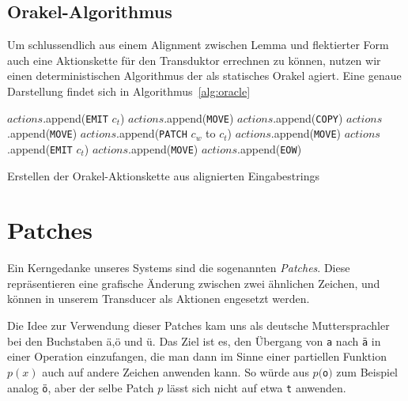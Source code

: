 \documentclass[a4paper]{article}
\newcommand{\action}[1]{\texttt{#1}}
\begin{document}
\subsection{Orakel-Algorithmus}
\label{sec:orakel-alg}
Um schlussendlich aus einem Alignment zwischen Lemma und flektierter Form auch eine Aktionskette für den Transduktor errechnen zu können, nutzen wir einen deterministischen Algorithmus der als statisches Orakel agiert. Eine genaue Darstellung findet sich in Algorithmus~\ref{alg:oracle}

\begin{algorithm}[htb]
\begin{algorithmic}
    	\STATE $actions$.append(\action{EMIT} $c_t$)
    	\STATE $actions$.append(\action{MOVE})
    	\STATE $actions$.append(\action{COPY})
        \STATE $actions$.append(\action{MOVE})
    	\STATE $actions$.append(\action{PATCH} $c_w$ to $c_t$)
        \STATE $actions$.append(\action{MOVE})
    	\STATE $actions$.append(\action{EMIT} $c_t$)
        \STATE $actions$.append(\action{MOVE})
    \ENDIF
\ENDFOR
\STATE $actions$.append(\action{EOW})
\end{algorithmic}
\caption{Erstellen der Orakel-Aktionskette aus alignierten Eingabestrings}
\label{alg:oracle}
\end{algorithm}

\section{Patches}
\label{sec:patches}
Ein Kerngedanke unseres Systems sind die sogenannten \textit{Patches}. Diese repräsentieren eine grafische Änderung zwischen zwei ähnlichen Zeichen, und können in unserem Transducer als Aktionen engesetzt werden.

Die Idee zur Verwendung dieser Patches kam uns als deutsche Muttersprachler bei den Buchstaben ä,ö und ü. Das Ziel ist es, den Übergang von \texttt{a} nach \texttt{ä} in einer Operation einzufangen, die man dann im Sinne einer partiellen Funktion $p(x)$ auch auf andere Zeichen anwenden kann. So würde aus $p($\texttt{o}$)$ zum Beispiel analog \texttt{ö}, aber der selbe Patch $p$ lässt sich nicht auf etwa \texttt{t} anwenden.
\end{document}
